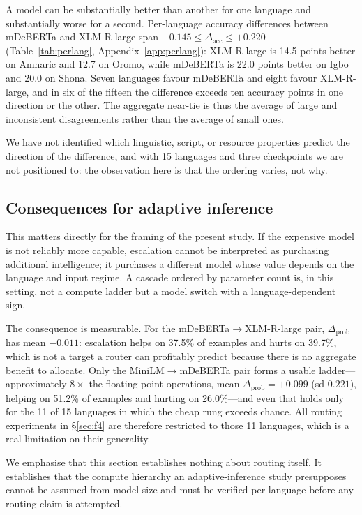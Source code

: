 \documentclass[11pt]{article}
\newcommand{\claim}[1]{#1}   %
\begin{document}
\claim{A model can be substantially better than another for one language and
substantially worse for a second.} Per-language accuracy differences between
mDeBERTa and XLM-R-large span
$-0.145 \le \Delta_{\mathrm{acc}} \le +0.220$
(Table~\ref{tab:perlang}, Appendix~\ref{app:perlang}): XLM-R-large is 14.5 points better on Amharic and
12.7 on Oromo, while mDeBERTa is 22.0 points better on Igbo and 20.0 on Shona.
Seven languages favour mDeBERTa and eight favour XLM-R-large, and in six of the
fifteen the difference exceeds ten accuracy points in one direction or the other.
The aggregate near-tie is thus the average of large and inconsistent
disagreements rather than the average of small ones.

We have not identified which linguistic, script, or resource properties predict
the direction of the difference, and with 15 languages and three checkpoints we are
not positioned to: the observation here is that the ordering varies, not why.

\subsection{Consequences for adaptive inference}

This matters directly for the framing of the present study.
\claim{If the expensive model is not reliably more capable, escalation cannot be
interpreted as purchasing additional intelligence; it purchases a different model
whose value depends on the language and input regime.} A cascade ordered by
parameter count is, in this setting, not a compute ladder but a model switch with
a language-dependent sign.

The consequence is measurable. For the mDeBERTa$\rightarrow$XLM-R-large pair,
$\Delta_{\mathrm{prob}}$ has mean $-0.011$: escalation helps on 37.5\% of
examples and hurts on 39.7\%, which is not a target a router can profitably
predict because there is no aggregate benefit to allocate. Only the
MiniLM$\rightarrow$mDeBERTa pair forms a usable ladder---approximately
$8\times$ the floating-point operations, mean $\Delta_{\mathrm{prob}} = +0.099$
(sd $0.221$), helping on 51.2\% of examples and hurting on 26.0\%---and even that
holds only for the 11 of 15 languages in which the cheap rung exceeds chance. All
routing experiments in \S\ref{sec:f4} are therefore restricted to those 11
languages, which is a real limitation on their generality.

We emphasise that this section establishes nothing about routing itself. It
establishes that the compute hierarchy an adaptive-inference study presupposes
cannot be assumed from model size and must be verified per language before any
routing claim is attempted.
\end{document}
